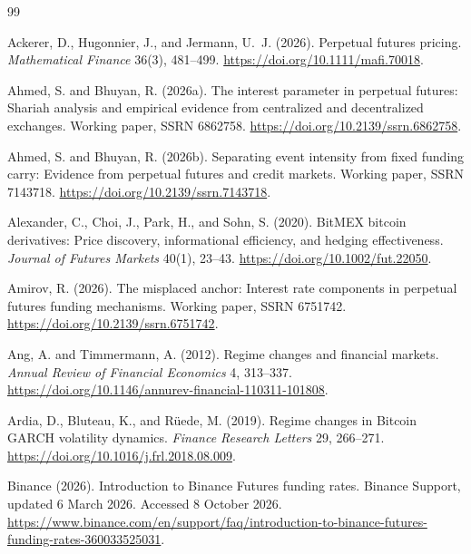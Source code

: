 \documentclass[10pt,a4paper]{article}
\begin{document}

\begin{thebibliography}{99}\setlength{\itemsep}{0pt}\fontsize{8}{9}\selectfont\raggedright

Ackerer, D., Hugonnier, J., and Jermann, U.~J. (2026).
\newblock Perpetual futures pricing.
\newblock \textit{Mathematical Finance} 36(3), 481--499.
\newblock \url{https://doi.org/10.1111/mafi.70018}.

Ahmed, S. and Bhuyan, R. (2026a).
\newblock The interest parameter in perpetual futures: Shariah analysis and empirical evidence from centralized and decentralized exchanges.
\newblock Working paper, SSRN 6862758.
\newblock \url{https://doi.org/10.2139/ssrn.6862758}.

Ahmed, S. and Bhuyan, R. (2026b).
\newblock Separating event intensity from fixed funding carry: Evidence from perpetual futures and credit markets.
\newblock Working paper, SSRN 7143718.
\newblock \url{https://doi.org/10.2139/ssrn.7143718}.

Alexander, C., Choi, J., Park, H., and Sohn, S. (2020).
\newblock BitMEX bitcoin derivatives: Price discovery, informational efficiency, and hedging effectiveness.
\newblock \textit{Journal of Futures Markets} 40(1), 23--43.
\newblock \url{https://doi.org/10.1002/fut.22050}.

Amirov, R. (2026).
\newblock The misplaced anchor: Interest rate components in perpetual futures funding mechanisms.
\newblock Working paper, SSRN 6751742.
\newblock \url{https://doi.org/10.2139/ssrn.6751742}.

Ang, A. and Timmermann, A. (2012).
\newblock Regime changes and financial markets.
\newblock \textit{Annual Review of Financial Economics} 4, 313--337.
\newblock \url{https://doi.org/10.1146/annurev-financial-110311-101808}.

Ardia, D., Bluteau, K., and R\"uede, M. (2019).
\newblock Regime changes in Bitcoin GARCH volatility dynamics.
\newblock \textit{Finance Research Letters} 29, 266--271.
\newblock \url{https://doi.org/10.1016/j.frl.2018.08.009}.

Binance (2026).
\newblock Introduction to Binance Futures funding rates. Binance Support, updated 6 March 2026. Accessed 8 October 2026.
\newblock \url{https://www.binance.com/en/support/faq/introduction-to-binance-futures-funding-rates-360033525031}.


\end{thebibliography}
\end{document}
